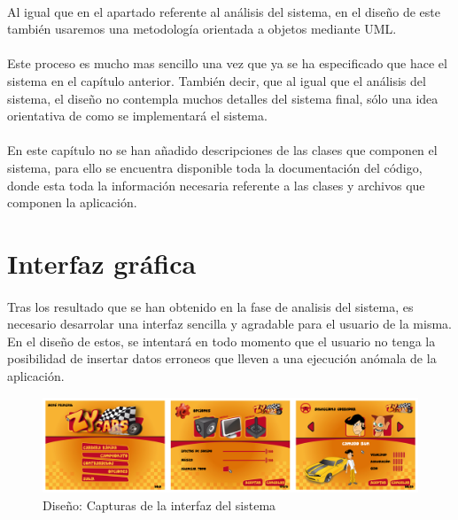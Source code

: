 

\paragraph{}
Al igual que en el apartado referente al análisis del sistema, en el diseño de este también usaremos una metodología orientada
a objetos mediante UML.

\paragraph{}
Este proceso es mucho mas sencillo una vez que ya se ha especificado que hace el sistema en el capítulo anterior. También decir, que
al igual que el análisis del sistema, el diseño no contempla muchos detalles del sistema final, sólo una idea orientativa de como
se implementará el sistema.

\paragraph{}
En este capítulo no se han añadido descripciones de las clases que componen el sistema, para ello se encuentra disponible toda la
documentación del código, donde esta toda la información necesaria referente a las clases y archivos que componen la aplicación.

\section{Interfaz gráfica}

\paragraph{}
Tras los resultado que se han obtenido en la fase de analisis del sistema, es necesario desarrolar una interfaz sencilla y agradable
para el usuario de la misma. En el diseño de estos, se intentará en todo momento que el usuario no tenga la posibilidad de insertar
datos erroneos que lleven a una ejecución anómala de la aplicación.

\begin{figure}[H]
  \label{interfaz}
  \begin{center}
    \includegraphics[scale=0.18]{imagenes/capturas/interfaz.png}
  \end{center}
  \caption{Diseño: Capturas de la interfaz del sistema}
\end{figure}

